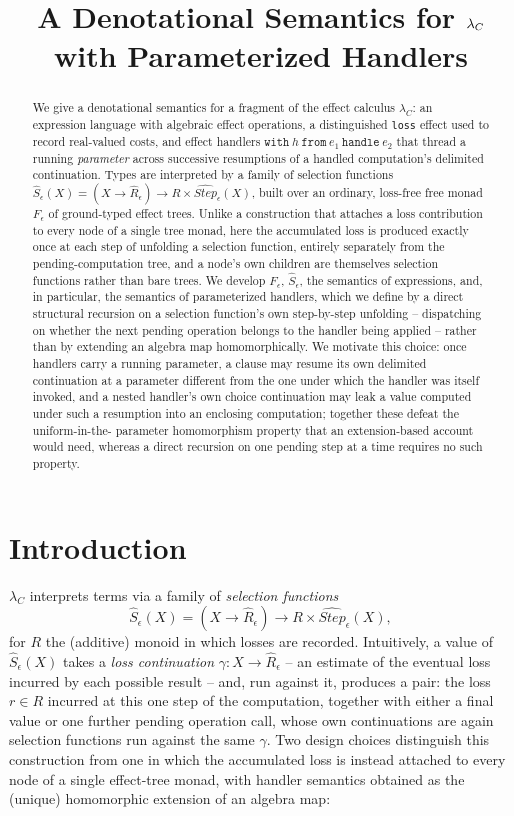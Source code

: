 \documentclass[11pt]{article}
\title{A Denotational Semantics for $\lC$ with Parameterized Handlers}
\author{}
\date{}
\theoremstyle{plain}
\newcommand{\Fm}[1]{F_{#1}}
\newcommand{\Rm}[1]{\widehat{R}_{#1}}
\newcommand{\Sm}[1]{\widehat{S}_{#1}}
\newcommand{\Stepm}[1]{\widehat{\mathit{Step}}_{#1}}
\newcommand{\eps}{\epsilon}
\newcommand{\lC}{\lambda_C}
\begin{document}
\maketitle

\begin{abstract}
We give a denotational semantics for a fragment of the effect calculus $\lC$: an
expression language with algebraic effect operations, a distinguished \texttt{loss}
effect used to record real-valued costs, and effect handlers
$\mathtt{with}\ h\ \mathtt{from}\ e_1\ \mathtt{handle}\ e_2$ that thread a running
\emph{parameter} across successive resumptions of a handled computation's delimited
continuation. Types are interpreted by a family of selection functions
$\Sm\eps(X) = (X\to\Rm\eps)\to R\times\Stepm\eps(X)$, built over an ordinary, loss-free
free monad $\Fm\eps$ of ground-typed effect trees. Unlike a construction that attaches a
loss contribution to every node of a single tree monad, here the accumulated loss is
produced exactly once at each step of unfolding a selection function, entirely separately
from the pending-computation tree, and a node's own children are themselves selection
functions rather than bare trees. We develop $\Fm\eps$, $\Sm\eps$, the semantics of
expressions, and, in particular, the semantics of parameterized handlers, which we define
by a direct structural recursion on a selection function's own step-by-step unfolding --
dispatching on whether the next pending operation belongs to the handler being applied --
rather than by extending an algebra map homomorphically. We motivate this choice: once
handlers carry a running parameter, a clause may resume its own delimited continuation at
a parameter different from the one under which the handler was itself invoked, and a
nested handler's own choice continuation may leak a value computed under such a
resumption into an enclosing computation; together these defeat the uniform-in-the-
parameter homomorphism property that an extension-based account would need, whereas a
direct recursion on one pending step at a time requires no such property.
\end{abstract}

\section{Introduction}

$\lC$ interprets terms via a family of \emph{selection functions}
\[
  \Sm\eps(X) = (X\to \Rm\eps)\to R\times\Stepm\eps(X),
\]
for $R$ the (additive) monoid in which losses are recorded. Intuitively, a value of
$\Sm\eps(X)$ takes a \emph{loss continuation} $\gamma:X\to\Rm\eps$ -- an estimate of the
eventual loss incurred by each possible result -- and, run against it, produces a pair: the
loss $r\in R$ incurred at this one step of the computation, together with either a final
value or one further pending operation call, whose own continuations are again selection
functions run against the same $\gamma$. Two design choices distinguish this construction
from one in which the accumulated loss is instead attached to every node of a single
effect-tree monad, with handler semantics obtained as the (unique) homomorphic extension of
an algebra map:
\end{document}
